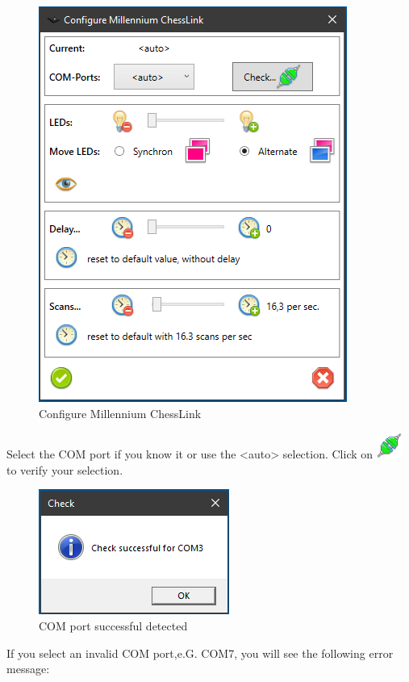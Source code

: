 \documentclass[11pt,a4paper]{article}
\begin{document}
\begin{figure}[H]
	\centering
	\includegraphics[scale=0.9]{MillenniumChessLink2.png}
	\caption{Configure Millennium ChessLink}
	\label{fig:MillenniumChessLink2}
\end{figure}

Select the COM port if you know it or use the <auto> selection.
Click on \includegraphics[scale=0.5]{connect.png} to verify your selection.

\begin{figure}[H]
	\centering
	\includegraphics[scale=1.0]{MillenniumChessLink3.png}
	\caption{COM port successful detected }
	\label{fig:MillenniumChessLink3}
\end{figure}

If you select an invalid COM port,e.G. COM7, you will see the following error message:
\end{document}
